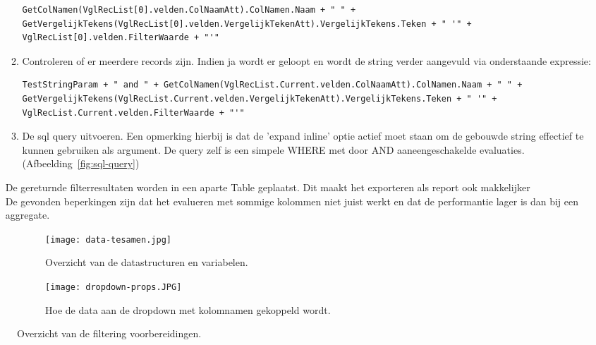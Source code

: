 \begin{itemize}
\begin{enumerate}
\begin{lstlisting}
GetColNamen(VglRecList[0].velden.ColNaamAtt).ColNamen.Naam + " " + GetVergelijkTekens(VglRecList[0].velden.VergelijkTekenAtt).VergelijkTekens.Teken + " '" + VglRecList[0].velden.FilterWaarde + "'"
\end{lstlisting}
        \item Controleren of er meerdere records zijn. Indien ja wordt er geloopt en wordt de string verder aangevuld via onderstaande expressie:
\begin{lstlisting}
TestStringParam + " and " + GetColNamen(VglRecList.Current.velden.ColNaamAtt).ColNamen.Naam + " " + GetVergelijkTekens(VglRecList.Current.velden.VergelijkTekenAtt).VergelijkTekens.Teken + " '" + VglRecList.Current.velden.FilterWaarde + "'"
\end{lstlisting}
        \item De sql query uitvoeren. Een opmerking hierbij is dat de 'expand inline' optie actief moet staan om de gebouwde string effectief te kunnen gebruiken als argument. De query zelf is een simpele WHERE met door AND aaneengeschakelde evaluaties. (Afbeelding~\ref{fig:sql-query})
    \end{enumerate}
    De gereturnde filterresultaten worden in een aparte Table geplaatst. Dit maakt het exporteren als report ook makkelijker\\
    De gevonden beperkingen zijn dat het evalueren met sommige kolommen niet juist werkt en dat de performantie lager is dan bij een aggregate.
\end{itemize}


\begin{figure}[h!]
    \centering
    \begin{subfigure}[b]{0.3\linewidth}
        \texttt{[image: data-tesamen.jpg]}
        \caption{Overzicht van de datastructuren en variabelen.}
    \end{subfigure}
    \begin{subfigure}[b]{0.5\linewidth}
        \texttt{[image: dropdown-props.JPG]}
        \caption{Hoe de data aan de dropdown met kolomnamen gekoppeld wordt.}
    \end{subfigure}
    \caption{Overzicht van de filtering voorbereidingen.}
    \label{fig:data-en-dropdown}
\end{figure}

